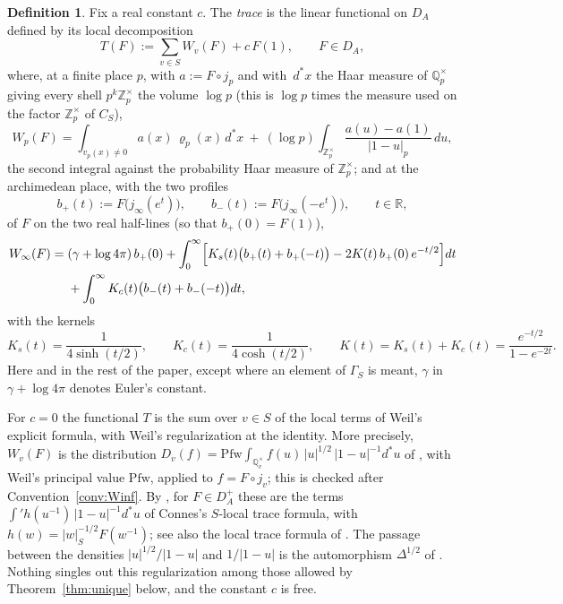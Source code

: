 \documentclass[11pt]{amsart}
\theoremstyle{definition}
\newtheorem{definition}[theorem]{Definition}
\theoremstyle{remark}
\newcommand{\R}{\mathbb R}
\newcommand{\Z}{\mathbb Z}
\newcommand{\Q}{\mathbb Q}
\newcommand{\dstar}{\,d^{*}}
\newcommand{\DA}{D_A}
\begin{document}
\begin{definition}\label{def:trace}
Fix a real constant $c$.  The \emph{trace} is the linear functional on $\DA$
defined by its local decomposition
\begin{equation}\label{eq:tracedef}
T(F):=\sum_{v\in S}W_v(F)+c\,F(1),\qquad F\in\DA ,
\end{equation}
where, at a finite place $p$, with $a:=F\circ j_p$ and with $\dstar x$ the Haar
measure of $\Q_p^{\times}$ giving every shell $p^{k}\Z_p^{\times}$ the volume
$\log p$ (this is $\log p$ times the measure used on the factor
$\Z_p^{\times}$ of $C_S$),
\begin{equation}\label{eq:Wp}
W_p(F)=\int_{v_p(x)\neq0}a(x)\,\varrho_p(x)\dstar x
\ +\ (\log p)\int_{\Z_p^{\times}}\frac{a(u)-a(1)}{|1-u|_p}\,du,
\end{equation}
the second integral against the probability Haar measure of
$\Z_p^{\times}$; and at the archimedean place, with the two profiles
\[
b_{+}(t):=F\bigl(j_{\infty}(e^{t})\bigr),\qquad
b_{-}(t):=F\bigl(j_{\infty}(-e^{t})\bigr),\qquad t\in\R,
\]
of $F$ on the two real half-lines (so that $b_{+}(0)=F(1)$),
\begin{equation}\label{eq:Winf}
\begin{aligned}
W_{\infty}(F)={}&(\gamma+\log4\pi)\,b_{+}(0)
+\int_0^{\infty}\Bigl[K_{s}(t)\bigl(b_{+}(t)+b_{+}(-t)\bigr)
-2K(t)\,b_{+}(0)\,e^{-t/2}\Bigr]dt\\
&+\int_0^{\infty}K_{c}(t)\bigl(b_{-}(t)+b_{-}(-t)\bigr)dt,
\end{aligned}
\end{equation}
with the kernels
\[
K_{s}(t)=\frac{1}{4\sinh(t/2)},\qquad K_{c}(t)=\frac{1}{4\cosh(t/2)},\qquad
K(t)=K_{s}(t)+K_{c}(t)=\frac{e^{-t/2}}{1-e^{-2t}} .
\]
Here and in the rest of the paper, except where an element of $\Gamma_S$ is
meant, $\gamma$ in $\gamma+\log4\pi$ denotes Euler's constant.
\end{definition}

For $c=0$ the functional $T$ is the sum over $v\in S$ of the local terms of
Weil's explicit formula, with Weil's regularization at the identity.
More precisely, $W_v(F)$ is the distribution
$D_v(f)=\mathrm{Pfw}\!\int_{\Q_v^{\times}}f(u)\,|u|^{1/2}\,|1-u|^{-1}d^{*}u$
of \cite[Appendix~II, (8)--(11)]{Connes99}, with Weil's principal value
$\mathrm{Pfw}$, applied to $f=F\circ j_v$; this is checked after
Convention~\ref{conv:Winf}.  By \cite[Theorem~4 and Appendix~II]{Connes99},
for $F\in\DA^{+}$ these are the terms $\int'h(u^{-1})\,|1-u|^{-1}d^{*}u$ of
Connes's $S$-local trace formula, with $h(w)=|w|_S^{-1/2}F(w^{-1})$; see also
the local trace formula of \cite[Section~3]{MeyerIdele}.  The passage between
the densities $|u|^{1/2}/|1-u|$ and $1/|1-u|$ is the automorphism
$\Delta^{1/2}$ of \cite[Introduction]{CCWeilArch}.
Nothing singles out this regularization among those allowed by
Theorem~\ref{thm:unique} below, and the constant $c$ is free.
\end{document}
